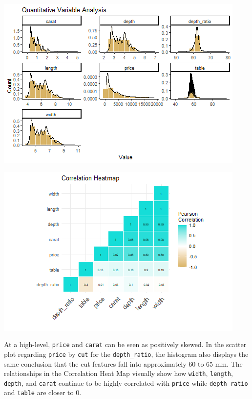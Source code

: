\documentclass[
  paper=a4,
  ,captions=tableheading
]{scrartcl}
\begin{document}
\begin{center}\includegraphics{Diamonds_PDF_files/figure-latex/Histograms-1} \end{center}

\begin{center}\includegraphics{Diamonds_PDF_files/figure-latex/Correlation-1} \end{center}

At a high-level, \texttt{price} and \texttt{carat} can be seen as
positively skewed. In the scatter plot regarding \texttt{price} by
\texttt{cut} for the \texttt{depth\_ratio}, the histogram also displays
the same conclusion that the cut features fall into approximately 60 to
65 mm. The relationships in the Correlation Heat Map visually show how
\texttt{width}, \texttt{length}, \texttt{depth}, and \texttt{carat}
continue to be highly correlated with \texttt{price} while
\texttt{depth\_ratio} and \texttt{table} are closer to 0.
\end{document}
